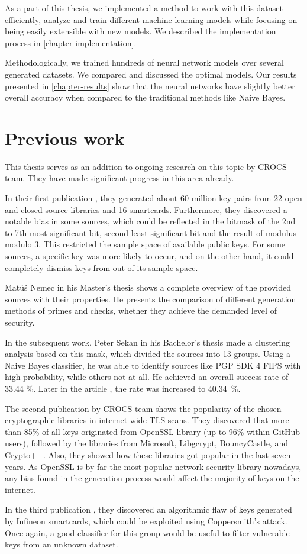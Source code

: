 As a part of this thesis, we implemented a method to work with this dataset efficiently, analyze and train different machine learning models while focusing on being easily extensible with new models. We described the implementation process in \autoref{chapter-implementation}.

Methodologically, we trained hundreds of neural network models over several generated datasets. We compared and discussed the optimal models. Our results presented in \autoref{chapter-results} show that the neural networks have slightly better overall accuracy when compared to the traditional methods like Naive Bayes.

\section{Previous work}
\label{chapter-prev-work}

This thesis serves as an addition to ongoing research on this topic by CROCS team. They have made significant progress in this area already. 

In their first publication \cite{svenda_1}, they generated about 60 million key pairs from 22 open and closed-source libraries and 16 smartcards. Furthermore, they discovered a notable bias in some sources, which could be reflected in the bitmask of the 2nd to 7th most significant bit, second least significant bit and the result of modulus modulo 3. This restricted the sample space of available public keys. For some sources, a specific key was more likely to occur, and on the other hand, it could completely dismiss keys from out of its sample space.

Mat\'{u}š Nemec in his Master's thesis \cite{thesis_matus_nemec} shows a complete overview of the provided sources with their properties. He presents the comparison of different generation methods of primes and checks, whether they achieve the demanded level of security.

In the subsequent work, Peter Sekan in his Bachelor's thesis \cite{thesis_sekan} made a clustering analysis based on this mask, which divided the sources into 13 groups. Using a Naive Bayes classifier, he was able to identify sources like PGP SDK 4 FIPS with high probability, while others not at all. He achieved an overall success rate of 33.44 \%. Later in the article \cite{svenda_1}, the rate was increased to 40.34~\%.

The second publication by CROCS team \cite{svenda_3} shows the popularity of the chosen cryptographic libraries in internet-wide TLS scans. They discovered that more than 85\% of all keys originated from OpenSSL library (up to 96\% within GitHub users), followed by the libraries from Microsoft, Libgcrypt, BouncyCastle, and Crypto++. Also, they showed how these libraries got popular in the last seven years. As OpenSSL is by far the most popular network security library nowadays, any bias found in the generation process would affect the majority of keys on the internet.

In the third publication \cite{svenda_2}, they discovered an algorithmic flaw of keys generated by Infineon smartcards, which could be exploited using Coppersmith's attack. Once again, a good classifier for this group would be useful to filter vulnerable keys from an unknown dataset.

